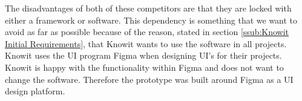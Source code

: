 The disadvantages of both of these competitors are that they are locked with either a framework or software. This dependency is something that we want to avoid as far as possible because of the reason, stated in section \ref{ssub:Knowit Initial Requirements}, that Knowit wants to use the software in all projects. Knowit uses the UI program Figma when designing UI's for their projects. Knowit is happy with the functionality within Figma and does not want to change the software. Therefore the prototype was built around Figma as a UI design platform. 



